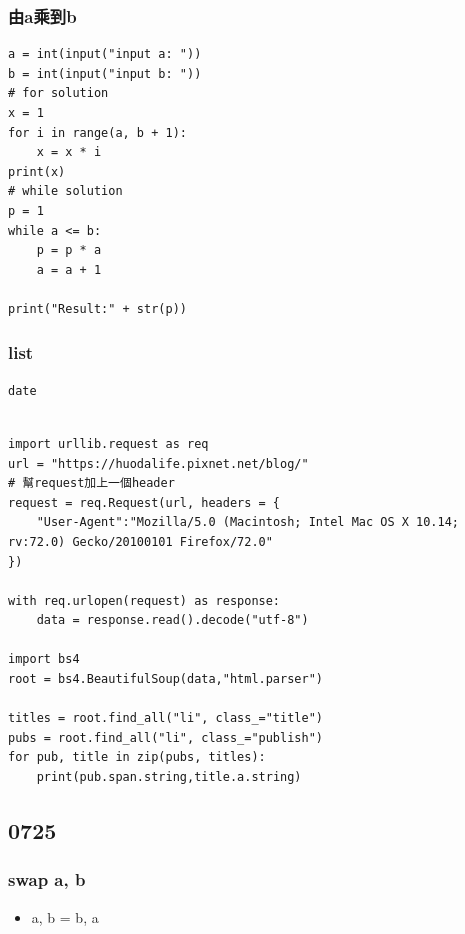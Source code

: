 \documentclass[a4paper,12pt]{article}
\begin{document}
\subsubsection{由a乘到b}
\label{sec:org9a75bfe}
\lstset{breaklines=true,language=Python,label=計算機,caption= ,captionpos=b,firstnumber=1,numbers=left}
\begin{lstlisting}
a = int(input("input a: "))
b = int(input("input b: "))
# for solution
x = 1
for i in range(a, b + 1):
    x = x * i
print(x)
# while solution
p = 1
while a <= b:
    p = p * a
    a = a + 1

print("Result:" + str(p))
\end{lstlisting}

\subsubsection{list}
\label{sec:org06ffc3e}
\lstset{breaklines=true,language=sh,label= ,caption= ,captionpos=b,numbers=none}
\begin{lstlisting}
date
\end{lstlisting}
\lstset{breaklines=true,language=Python,label= ,caption= ,captionpos=b,firstnumber=1,numbers=left}
\begin{lstlisting}

import urllib.request as req
url = "https://huodalife.pixnet.net/blog/"
# 幫request加上一個header
request = req.Request(url, headers = {
    "User-Agent":"Mozilla/5.0 (Macintosh; Intel Mac OS X 10.14; rv:72.0) Gecko/20100101 Firefox/72.0"
})

with req.urlopen(request) as response:
    data = response.read().decode("utf-8")

import bs4
root = bs4.BeautifulSoup(data,"html.parser")

titles = root.find_all("li", class_="title")
pubs = root.find_all("li", class_="publish")
for pub, title in zip(pubs, titles):
    print(pub.span.string,title.a.string)
\end{lstlisting}


\subsection{0725}
\label{sec:orgc613a68}
\subsubsection{swap a, b}
\label{sec:org64df84e}
\begin{itemize}
\item a, b = b, a\\
\end{itemize}
\end{document}
